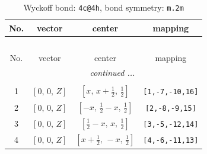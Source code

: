 \documentclass[fleqn,8pt]{jsarticle}
\begin{document}
\renewcommand{\arraystretch}{1.2}
\begin{longtable}{cccc}
\caption{Wyckoff bond: {\tt 4c@4h}, bond symmetry: {\tt m.2m}}
 \\
 \hline \hline
No. & vector & center & mapping \\ \hline \endfirsthead

\multicolumn{3}{l}{\tablename\ \thetable{}} \\
 \hline \hline
No. & vector & center & mapping \\ \hline \endhead

 \hline \hline
\multicolumn{3}{r}{\footnotesize\it continued ...} \\ \endfoot

 \hline \hline
\multicolumn{3}{r}{} \\ \endlastfoot

1 & $\left[ 0,\, 0,\, Z \right]$ & $\left[ x,\, x + \frac{1}{2},\, \frac{1}{2} \right]$ & {\tt [1,-7,-10,16]} \\ \hline
2 & $\left[ 0,\, 0,\, Z \right]$ & $\left[ - x,\, \frac{1}{2} - x,\, \frac{1}{2} \right]$ & {\tt [2,-8,-9,15]} \\ \hline
3 & $\left[ 0,\, 0,\, Z \right]$ & $\left[ \frac{1}{2} - x,\, x,\, \frac{1}{2} \right]$ & {\tt [3,-5,-12,14]} \\ \hline
4 & $\left[ 0,\, 0,\, Z \right]$ & $\left[ x + \frac{1}{2},\, - x,\, \frac{1}{2} \right]$ & {\tt [4,-6,-11,13]} \\
\end{longtable}
\renewcommand{\arraystretch}{1.2}
\end{document}

